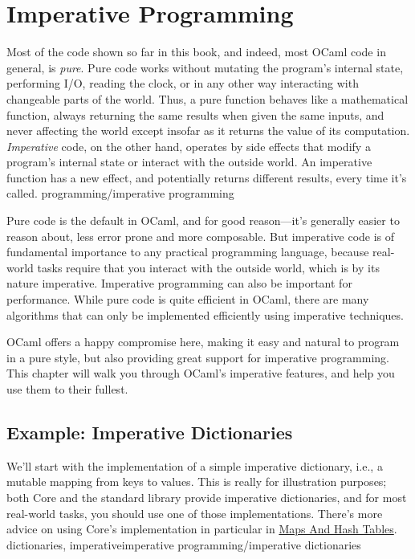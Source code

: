 \hypertarget{imperative-programming-1}{%
\section{Imperative Programming}\label{imperative-programming-1}}

Most of the code shown so far in this book, and indeed, most OCaml code
in general, is \emph{pure}. Pure code works without mutating the
program's internal state, performing I/O, reading the clock, or in any
other way interacting with changeable parts of the world. Thus, a pure
function behaves like a mathematical function, always returning the same
results when given the same inputs, and never affecting the world except
insofar as it returns the value of its computation. \emph{Imperative}
code, on the other hand, operates by side effects that modify a
program's internal state or interact with the outside world. An
imperative function has a new effect, and potentially returns different
results, every time it's called. \protect\hypertarget{PROGimper}{}{programming/imperative
programming}

Pure code is the default in OCaml, and for good reason---it's generally
easier to reason about, less error prone and more composable. But
imperative code is of fundamental importance to any practical
programming language, because real-world tasks require that you interact
with the outside world, which is by its nature imperative. Imperative
programming can also be important for performance. While pure code is
quite efficient in OCaml, there are many algorithms that can only be
implemented efficiently using imperative techniques.

OCaml offers a happy compromise here, making it easy and natural to
program in a pure style, but also providing great support for imperative
programming. This chapter will walk you through OCaml's imperative
features, and help you use them to their fullest.

\hypertarget{example-imperative-dictionaries}{%
\subsection{Example: Imperative
Dictionaries}\label{example-imperative-dictionaries}}

We'll start with the implementation of a simple imperative dictionary,
i.e., a mutable mapping from keys to values. This is really for
illustration purposes; both Core and the standard library provide
imperative dictionaries, and for most real-world tasks, you should use
one of those implementations. There's more advice on using Core's
implementation in particular in
\href{maps-and-hashtables.html\#maps-and-hash-tables}{Maps And Hash
Tables}. \protect\hypertarget{DICTimper}{}{dictionaries,
imperative}\protect\hypertarget{IPimpdict}{}{imperative
programming/imperative dictionaries}

